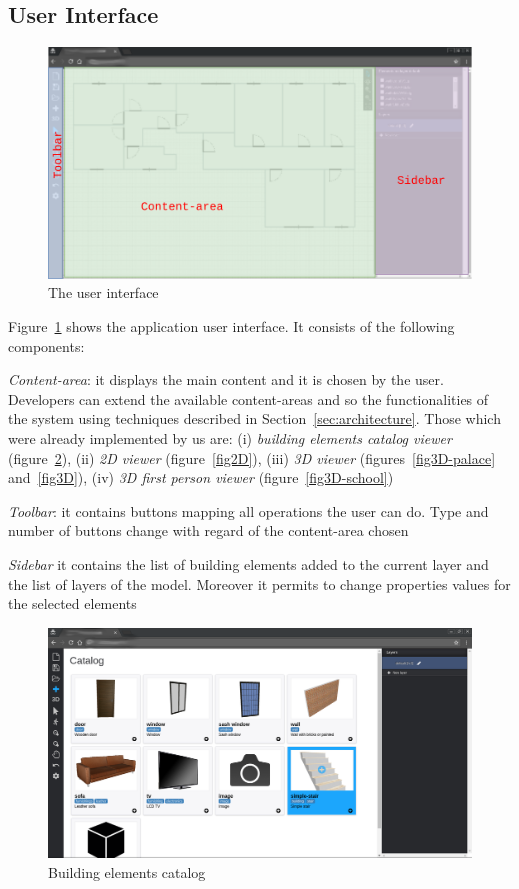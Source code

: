 \subsection{User Interface}\label{ssec:ui}

\begin{figure}[htb]
\centering
\includegraphics[width=\linewidth]{contents/images/mock-interfaccia}
\caption{The user interface}
\label{figInterface}
\end{figure}

Figure~\ref{figInterface} shows the application user interface. It consists of the following components:

\emph{Content-area}: it displays the main content and it is chosen by the user. Developers can extend the available content-areas and so the functionalities of the system using techniques described in Section~\ref{sec:architecture}. Those which were already implemented by us are: (i) \emph{building elements catalog viewer} (figure~\ref{figCatalogo}), (ii) \emph{2D viewer} (figure~\ref{fig2D}), (iii) \emph{3D viewer} (figures~\ref{fig3D-palace} and~\ref{fig3D}), (iv) \emph{3D first person viewer} (figure~\ref{fig3D-school})

\emph{Toolbar}: it contains buttons mapping all operations the user can do. Type and number of buttons change with regard of the content-area chosen

\emph{Sidebar} it contains the list of building elements added to the current layer and the list of layers of the model. Moreover it permits to change properties values for the selected elements\\

\begin{figure}[htb]
\centering
\includegraphics[width=\linewidth]{contents/images/figcatalog}
\caption{Building elements catalog}
\label{figCatalogo}
\end{figure}

